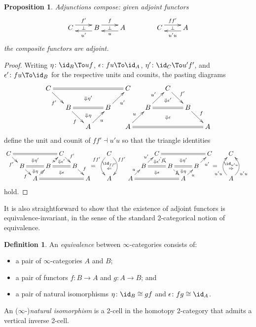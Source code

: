\documentclass[12pt,reqno]{amsart}
\theoremstyle{plain}
\newtheorem{prop}[thm]{Proposition}
\theoremstyle{definition}
\newtheorem{defn}[thm]{Definition}
\theoremstyle{remark}
\numberwithin{equation}{subsection}
\begin{document}
\begin{prop}\label{prop:adjunctions-compose} Adjunctions compose: given adjoint functors
\[ \vcenter{\xymatrix{ C \ar@<1ex>[r]^{f'} \ar@{}[r]|\perp & B \ar@<1ex>[r]^f \ar@<1ex>[l]^{u'} \ar@{}[r]|\perp & A  \ar@<1ex>[l]^u}} \qquad \rightsquigarrow\qquad  \vcenter{\xymatrix{ C \ar@<1ex>[r]^{ff'} \ar@{}[r]|\perp & A \ar@<1ex>[l]^{u'u}}}\] the composite functors are adjoint.
\end{prop}
\begin{proof}
Writing $\eta \colon \id_B \To uf$, $\epsilon \colon fu \To \id_A$, $\eta' \colon \id_C \To u'f'$, and $\epsilon' \colon fu \To \id_B$ for the respective units and counits, the pasting diagrams 
\[ \xymatrix@=1.5em{  C \ar[dr]_{f'} \ar@{=}[rrrr] & & \ar@{}[d]|{\Downarrow \eta'} & & C & & C \ar@{}[d]|(.6){\Downarrow\epsilon'} \ar[dr]^{f'} \\ & B \ar@{=}[rr] \ar[dr]_f & \ar@{}[d]|(.4){\Downarrow\eta} & B \ar[ur]_{u'} & & B \ar[ur]^{u'} \ar@{=}[rr] & \ar@{}[d]|{\Downarrow\epsilon} & B \ar[dr]^f \\ & & A \ar[ur]_u & & A \ar[ur]^u \ar@{=}[rrrr] & & & & A}\] define the unit and counit of $ff' \dashv u'u$ so that the triangle identities
\[ \xymatrix@=.70em{  C \ar[dr]_{f'} \ar@{=}[rrrr] & & \ar@{}[d]|{\Downarrow \eta'} & & C  \ar@{}[d]|(.6){\Downarrow\epsilon'} \ar[dr]^{f'}& & && C   \ar@/^3ex/[dd]^(.3){ff'} \ar@/_3ex/[dd]_(.3){ff'} \ar@{}[dd]|(.4){\id_{ff'}}|(.6){\Leftarrow} &   &&  & C \ar@{}[d]|(.6){\Downarrow\epsilon'} \ar[dr]|{f'} \ar@{=}[rrrr] & & \ar@{}[d]|{\Downarrow \eta'} & & C & & C  \\ & B \ar@{=}[rr] \ar[dr]_f & \ar@{}[d]|(.4){\Downarrow\eta} & B \ar[ur]|{u'}  \ar@{=}[rr] & \ar@{}[d]|{\Downarrow\epsilon} & B \ar[dr]^f & & \ar@{}[l]|{\displaystyle =} & &&   & B \ar[ur]^{u'} \ar@{=}[rr] & \ar@{}[d]|{\Downarrow\epsilon} & B \ar[dr]|f   \ar@{=}[rr] & \ar@{}[d]|(.4){\Downarrow\eta} & B \ar[ur]_{u'} & & \ar@{}[l]|{\displaystyle =}  \\ & & A \ar[ur]|u  \ar@{=}[rrrr] & & & & A & &  A & &   A \ar[ur]^u \ar@{=}[rrrr] & & & & A \ar[ur]_u & & & &  A \ar@/^3ex/[uu]^(.3){u'u} \ar@/_3ex/[uu]_(.3){u'u} \ar@{}[uu]|(.6){\id_{u'u}}|(.4){\Rightarrow} & &  } \] 
hold.
\end{proof}

It is also straightforward to show that the existence of adjoint functors is equivalence-invariant, in the sense of the standard 2-categorical notion of equivalence.

\begin{defn}\label{defn:equivalence} An \emph{equivalence} between $\infty$-categories consists of:
\begin{itemize}
\item a pair of $\infty$-categories $A$ and $B$;
\item a pair of functors $f \colon B \to A$ and $g \colon A \to B$; and
\item a pair of natural isomorphisms  $\eta \colon \id_B \cong gf$ and $\epsilon \colon fg \cong \id_A$.
\end{itemize}
An ($\infty$-)\emph{natural isomorphism} is a 2-cell in the homotopy 2-category that admits a vertical inverse 2-cell.
\end{defn}
\end{document}
